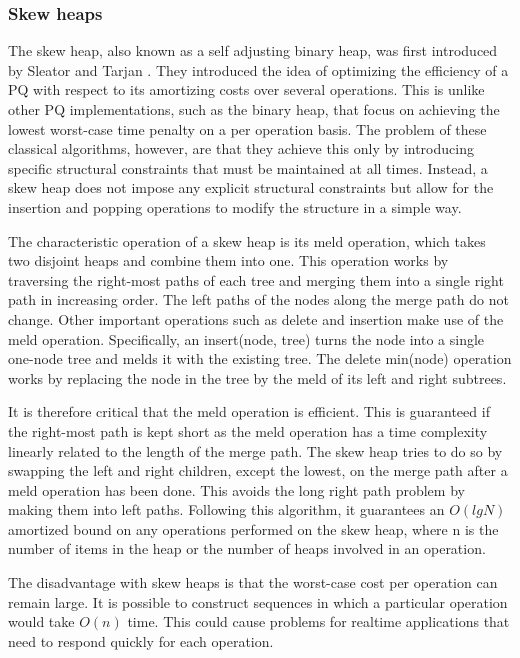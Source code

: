 \documentclass{article}
\begin{document}
\subsubsection{Skew heaps} \label{heapbackground}
The skew heap, also known as a self adjusting binary heap, was first introduced by Sleator and Tarjan \cite{sleator}. They introduced the idea of optimizing the efficiency of a PQ with respect to its amortizing costs over several operations. This is unlike other PQ implementations, such as the binary heap, that focus on achieving the lowest worst-case time penalty on a per operation basis. The problem of these classical algorithms, however, are that they achieve this only by introducing specific structural constraints that must be maintained at all times. Instead, a skew heap does not impose any explicit structural constraints but allow for the insertion and popping operations to modify the structure in a simple way.

The characteristic operation of a skew heap is its meld operation, which takes two disjoint heaps and combine them into one. This operation works by traversing the right-most paths of each tree and merging them into a single right path in increasing order. The left paths of the nodes along the merge path do not change. Other important operations such as delete and insertion make use of the meld operation. Specifically, an insert(node, tree) turns the node into a single one-node tree and melds it with the existing tree. The delete min(node) operation works by replacing the node in the tree by the meld of its left and right subtrees.

It is therefore critical that the meld operation is efficient. This is guaranteed if the right-most path is kept short as the meld operation has a time complexity linearly related to the length of the merge path. The skew heap tries to do so by swapping the left and right children, except the lowest, on the merge path after a meld operation has been done. This avoids the long right path problem by making them into left paths. Following this algorithm, it guarantees an \(O(lg N)\) amortized bound on any operations performed on the skew heap, where n is the number of items in the heap or the number of heaps involved in an operation.

The disadvantage with skew heaps is that the worst-case cost per operation can remain large. It is possible to construct sequences in which a particular operation would take \(O(n)\) time. This could cause problems for realtime applications that need to respond quickly for each operation.
\end{document}
